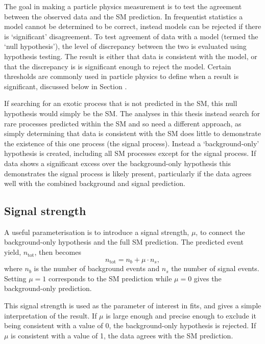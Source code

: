 
The goal in making a particle physics measurement is to test the agreement
between the observed data and the \ac{SM} prediction.  In frequentist statistics
a model cannot be determined to be correct, instead models can be rejected if
there is `significant' disagreement. To test agreement of data with a model
(termed the `null hypothesis'), the level of discrepancy between the two is
evaluated using hypothesis testing.  The result is either that data is
consistent with the model, or that the discrepancy is is significant enough to
reject the model.
Certain thresholds are commonly used in particle physics to define when a result
is significant, discussed below in Section
\label{sec:methods-stats-signifthresh}.

If searching for an exotic process that is not predicted in the \ac{SM}, this
null hypothesis would simply be the \ac{SM}. The analyses in this thesis instead
search for rare processes predicted within the \ac{SM} and so need a different
approach, as simply determining that data is consistent with the \ac{SM} does
little to demonstrate the existence of this one process (the signal process).
Instead a `background-only' hypothesis is created, including all \ac{SM}
processes except for the signal process. If data shows a significant excess over
the background-only hypothesis this demonstrates the signal process is likely
present, particularly if the data agrees well with the combined background and
signal prediction.

\subsection{Signal strength}

A useful parameterisation is to introduce a signal strength, $\mu$, to connect
the background-only hypothesis and the full \ac{SM} prediction. The predicted
event yield, $n_\text{tot}$, then becomes
\begin{equation*}
  n_\text{tot} = n_b + \mu\cdot n_s,
\end{equation*}
where $n_b$ is the number of background events and $n_s$ the number of signal
events. Setting $\mu=1$ corresponds to the \ac{SM} prediction while $\mu=0$
gives the background-only prediction.

This signal strength is used as the parameter of interest in fits, and gives a
simple interpretation of the result. If $\mu$ is large enough and precise enough
to exclude it being consistent with a value of 0, the background-only hypothesis is
rejected. If $\mu$ is consistent with a value of 1, the data agrees with the
\ac{SM} prediction.


